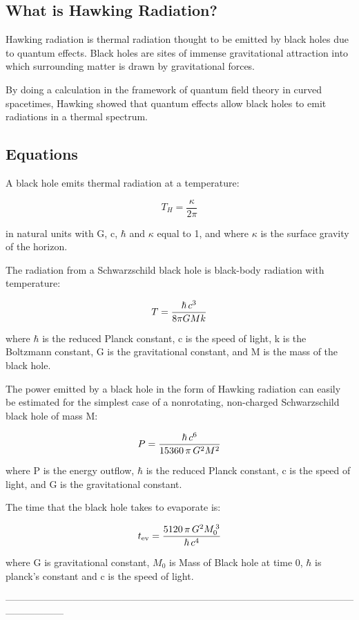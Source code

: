 \subsection{What is Hawking Radiation?}
{

Hawking radiation is thermal radiation thought to be emitted by black holes due to quantum effects. Black holes are sites of immense gravitational attraction into which surrounding matter is drawn by gravitational forces.


By doing a calculation in the framework of quantum field theory in curved spacetimes, Hawking showed that quantum effects allow black holes to emit radiations in a thermal spectrum.
}

\subsection{Equations}
{

A black hole emits thermal radiation at a temperature:

	\begin{equation}
	T_H = \frac{\kappa}{2 \pi}
	\end{equation}

in natural units with G, c, $\hbar$ and $\kappa$ equal to 1, and where $\kappa$ is the surface gravity of the horizon. \newline



The radiation from a Schwarzschild black hole is black-body radiation with temperature:

	\begin{equation}
	T={\hbar\,c^3\over8\pi G M k}
	\end{equation}

where $\hbar$ is the reduced Planck constant, c is the speed of light, k is the Boltzmann constant, G is the gravitational constant, and M is the mass of the black hole.
\newline



The power emitted by a black hole in the form of Hawking radiation can easily be estimated for the simplest case of a nonrotating, non-charged Schwarzschild black hole of mass M:

	\begin{equation}
	P={\hbar\,c^6\over15360\,\pi\,G^2M^2}
	\end{equation}

where P is the energy outflow, $\hbar$ is the reduced Planck constant, c is the speed of light, and G is the gravitational constant.
\newline



The time that the black hole takes to evaporate is:

	\begin{equation}
	t_{\operatorname{ev}}={5120\,\pi\,G^2M_0^{\,3}\over\hbar\,c^4}
	\end{equation}

where G is gravitational constant, $M_0$ is Mass of Black hole at time 0, $\hbar$ is planck's constant and c is the speed of light.
}

------------------------------------------------------------------------------------------------------------------------------
